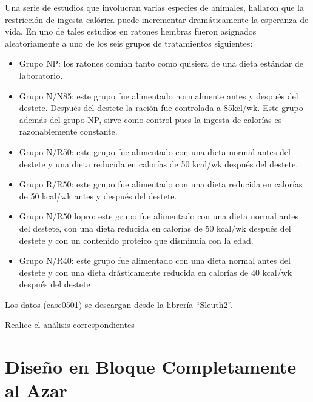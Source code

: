 \documentclass[]{book}
\providecommand{\tightlist}{%
  \setlength{\itemsep}{0pt}\setlength{\parskip}{0pt}}
\begin{document}
Una serie de estudios que involucran varias especies de animales,
hallaron que la restricción de ingesta calórica puede incrementar
dramáticamente la esperanza de vida. En uno de tales estudios en ratones
hembras fueron asignados aleatoriamente a uno de los seis grupos de
tratamientos siguientes:

\begin{itemize}
\tightlist
\item
  Grupo NP: los ratones comían tanto como quisiera de una dieta estándar
  de laboratorio.
\item
  Grupo N/N85: este grupo fue alimentado normalmente antes y después del
  destete. Después del destete la ración fue controlada a 85kcl/wk. Este
  grupo además del grupo NP, sirve como control pues la ingesta de
  calorías es razonablemente constante.
\item
  Grupo N/R50: este grupo fue alimentado con una dieta normal antes del
  destete y una dieta reducida en calorías de 50 kcal/wk después del
  destete.
\item
  Grupo R/R50: este grupo fue alimentado con una dieta reducida en
  calorías de 50 kcal/wk antes y después del destete.
\item
  Grupo N/R50 lopro: este grupo fue alimentado con una dieta normal
  antes del destete, con una dieta reducida en calorías de 50 kcal/wk
  después del destete y con un contenido proteico que disminuía con la
  edad.
\item
  Grupo N/R40: este grupo fue alimentado con una dieta normal antes del
  destete y con una dieta drásticamente reducida en calorías de 40
  kcal/wk después del destete
\end{itemize}

Los datos (case0501) se descargan desde la librería ``Sleuth2''.

Realice el análisis correspondientes

\chapter{Diseño en Bloque Completamente al
Azar}\label{diseno-en-bloque-completamente-al-azar}
\end{document}
